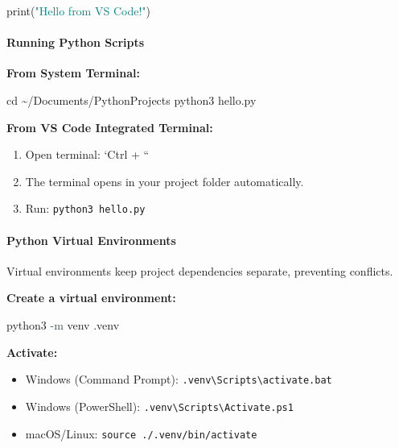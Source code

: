 \documentclass[
  justified,
  openright,
]{tufte-book}
\let\subsubsection\paragraph
\let\paragraph\paragraph
\newcommand{\AttributeTok}[1]{\textcolor{DarkSlateGray}{#1}}
\newcommand{\BuiltInTok}[1]{#1}
\newcommand{\ExtensionTok}[1]{#1}
\newcommand{\NormalTok}[1]{#1}
\newcommand{\StringTok}[1]{\textcolor{Teal}{#1}}
\newenvironment{Shaded}{%
  \begin{snugshade}
}{%
  \end{snugshade}
}
\let\subsubsection\paragraph
\let\paragraph\paragraph
\providecommand{\tightlist}{%
  \setlength{\itemsep}{0pt}\setlength{\parskip}{0pt}}
\begin{document}
\begin{Shaded}
\begin{Highlighting}[]
\BuiltInTok{print}\NormalTok{(}\StringTok{"Hello from VS Code!"}\NormalTok{)}
\end{Highlighting}
\end{Shaded}

\subsubsection{Running Python Scripts}\label{running-python-scripts}

\textbf{From System Terminal:}

\begin{Shaded}
\begin{Highlighting}[]
\BuiltInTok{cd}\NormalTok{ \textasciitilde{}/Documents/PythonProjects}
\ExtensionTok{python3}\NormalTok{ hello.py}
\end{Highlighting}
\end{Shaded}

\textbf{From VS Code Integrated Terminal:}

\begin{enumerate}
\def\labelenumi{\arabic{enumi}.}
\tightlist
\item
  Open terminal: `Ctrl + ``
\item
  The terminal opens in your project folder automatically.
\item
  Run: \texttt{python3\ hello.py}
\end{enumerate}

\subsubsection{Python Virtual
Environments}\label{python-virtual-environments}

Virtual environments keep project dependencies separate, preventing
conflicts.

\textbf{Create a virtual environment:}

\begin{Shaded}
\begin{Highlighting}[]
\ExtensionTok{python3} \AttributeTok{{-}m}\NormalTok{ venv .venv}
\end{Highlighting}
\end{Shaded}

\textbf{Activate:}

\begin{itemize}
\tightlist
\item
  Windows (Command Prompt):
  \texttt{.venv\textbackslash{}Scripts\textbackslash{}activate.bat}
\item
  Windows (PowerShell):
  \texttt{.venv\textbackslash{}Scripts\textbackslash{}Activate.ps1}
\item
  macOS/Linux: \texttt{source\ ./.venv/bin/activate}
\end{itemize}
\end{document}
